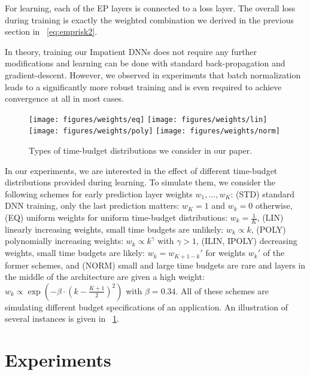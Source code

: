 \documentclass{bmvc2k}
\begin{document}
    For learning, each of the EP layers is connected to a loss layer.
    The overall loss during training is exactly the weighted combination we derived in the
    previous section in \equationname~\eqref{eq:emprisk2}.

    In theory, training our Impatient DNNs does not require any further modifications
    and learning can be done with standard back-propagation and gradient-descent.
    However, we observed in experiments that batch normalization~\cite{ioffe2015batch} leads
    to a significantly more robust training and is even required to achieve convergence
    at all in most cases.

    \begin{figure}[tb]
        \texttt{[image: figures/weights/eq]}
        \texttt{[image: figures/weights/lin]}
        \texttt{[image: figures/weights/poly]}
        \texttt{[image: figures/weights/norm]}
        \caption{Types of time-budget distributions we consider in our paper.}
        \label{fig:budgettypes}
    \end{figure}
    In our experiments, we are interested in the effect of different time-budget distributions provided during learning.
    To simulate them, we consider the following schemes for early prediction layer weights $w_1, \ldots, w_K$:
%
%
    (STD) standard DNN training, \ie only the last prediction matters: $w_K = 1$ and $w_k = 0$ otherwise, 
    (EQ) uniform weights for uniform time-budget distributions: $w_k = \frac{1}{K}$, 
    (LIN) linearly increasing weights, \ie small time budgets are unlikely: $w_k \propto k$,
    (POLY) polynomially increasing weights: $w_k \propto k^\gamma$ with $\gamma > 1$,
    (ILIN, IPOLY) decreasing weights, \ie small time budgets are likely: $w_k = w_{K+1-k}'$ for weights $w_k'$ of the former schemes,
    and (NORM) small and large time budgets are rare and layers in the middle of the architecture are given a high weight: $w_k \propto \exp(- \beta \cdot (k-\frac{K+1}{2})^2)$ with $\beta = 0.34$.
%
    All of these schemes are simulating different budget specifications of an application.
    An illustration of several instances is given in \figurename~\ref{fig:budgettypes}.

\section{Experiments}
\label{sec:exp}
    
\end{document}
